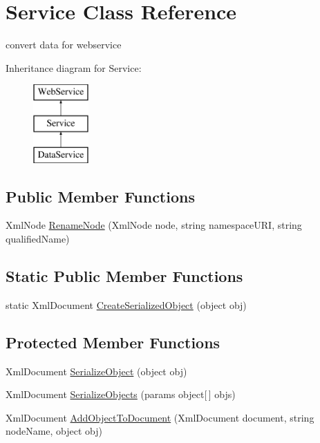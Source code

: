 \hypertarget{class_service}{\section{Service Class Reference}
\label{class_service}
}


convert data for webservice  


Inheritance diagram for Service\-:\begin{figure}[H]
\begin{center}
\leavevmode
\includegraphics[height=3.000000cm]{class_service}
\end{center}
\end{figure}
\subsection*{Public Member Functions}
\begin{DoxyCompactItemize}
\item 
Xml\-Node \hyperlink{class_service_afd14865bdacaac0b84c2efea89320654}{Rename\-Node} (Xml\-Node node, string namespace\-U\-R\-I, string qualified\-Name)
\end{DoxyCompactItemize}
\subsection*{Static Public Member Functions}
\begin{DoxyCompactItemize}
\item 
static Xml\-Document \hyperlink{class_service_a6836ee15cfea9c0c97f5faefe540e190}{Create\-Serialized\-Object} (object obj)
\end{DoxyCompactItemize}
\subsection*{Protected Member Functions}
\begin{DoxyCompactItemize}
\item 
Xml\-Document \hyperlink{class_service_ab7266bcacaec5b4730d2cb7337b0353d}{Serialize\-Object} (object obj)
\item 
Xml\-Document \hyperlink{class_service_a5cbb22d24af1f69815d164fc8e4638b0}{Serialize\-Objects} (params object\mbox{[}$\,$\mbox{]} objs)
\item 
Xml\-Document \hyperlink{class_service_ae2b167bdde3ac6e6f69a29fbee3b56cd}{Add\-Object\-To\-Document} (Xml\-Document document, string node\-Name, object obj)
\end{DoxyCompactItemize}



